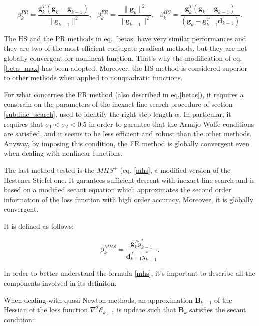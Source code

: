 			\begin{equation}
			\label{betas}
				 \beta^{PR}_k = \frac{\textbf{g}_k^T(\textbf{g}_k-\textbf{g}_{k-1})}{\|\textbf{g}_{k-1}\|^2}, \text{ }
 				 \beta^{FR}_k = \frac{\|\textbf{g}_{k}\|^2}{\|\textbf{g}_{k-1}\|^2}, \text{ }
 				 \beta^{HS}_k = \frac{\textbf{g}_k^T(\textbf{g}_k-\textbf{g}_{k-1})}{(\textbf{g}_k-\textbf{g}_{k-1}^T\textbf{d}_{k-1})}.
			\end{equation}

			The HS and the PR methods in eq. \ref{betas} have very similar performances and they are two of the most efficient conjugate gradient methods, but they are not globally convergent for nonlineat function. That's why the modification of eq. \ref{beta_max} has been adopted.
			Moreover, the HS method is considered superior to other methods when applied to nonquadratic functions.

			For what concernes the FR method (also described in eq.\ref{betas}), it requires a constrain on the parameters of the inexact line search procedure of section \ref{sub:line_search}, used to identify the right step length $\alpha$. In particular, it requires that $\sigma_1 < \sigma_2 < 0.5$ in order to garantee that the Armijo Wolfe conditions are satisfied, and it seems to be less efficient and robust than the other methods.%
			Anyway, by imposing this condition, the FR method is globally convergent even when dealing with nonlinear functions.

			The last method tested is the $MHS^+$ (eq. \ref{mhs}, a modified version of the Hestenes-Stiefel one.  %
			It garantees sufficient descent with inexact line search and is based on a modified secant equation which approximates the second order information of the loss function with high order accuracy. Moreover, it is globally convergent.

			It is defined as follows:

			\begin{equation}
			\label{mhs}
 				 \beta^{MHS}_k = \frac{\mathbf{g}_k^T \widetilde{y}_{k-1}^*}{\mathbf{d}_{k-1}^T\widetilde{y}_{k-1}^*}.
			\end{equation}

			In order to better understand the formula \ref{mhs}, it's important to describe all the components involved in its definiton.

			When dealing with quasi-Newton methods, an approximation $\textbf{B}_{k-1}$ of the Hessian of the loss function $\nabla^2\mathcal{E}_{k-1}$ is update such that $\textbf{B}_k$ satisfies the secant condition:

